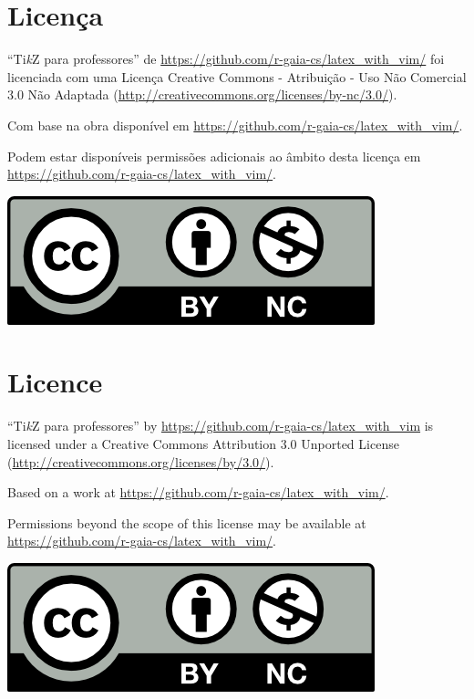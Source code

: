 % 
% 
% 
% 
% 
\section*{Licen\c{c}a}

``Ti\emph{k}Z para professores'' de \url{https://github.com/r-gaia-cs/latex_with_vim/} foi licenciada com uma Licen\c{c}a Creative Commons - Atribui\c{c}\~{a}o - Uso N\~{a}o Comercial 3.0 N\~{a}o Adaptada (\url{http://creativecommons.org/licenses/by-nc/3.0/}). 

Com base na obra dispon\'{i}vel em \url{https://github.com/r-gaia-cs/latex_with_vim/}. 

Podem estar dispon\'{i}veis permiss\~{o}es adicionais ao \^{a}mbito desta licen\c{c}a em \url{https://github.com/r-gaia-cs/latex_with_vim/}.

\begin{center}
    \includegraphics[keepaspectratio=true]{../../figures/by_nc.png}
\end{center}

\section*{Licence}

``Ti\emph{k}Z para professores'' by \url{https://github.com/r-gaia-cs/latex_with_vim} is licensed under a Creative Commons Attribution 3.0 Unported License (\url{http://creativecommons.org/licenses/by/3.0/}).

Based on a work at \url{https://github.com/r-gaia-cs/latex_with_vim/}.

Permissions beyond the scope of this license may be available at \url{https://github.com/r-gaia-cs/latex_with_vim/}.

\begin{center}
    \includegraphics[keepaspectratio=true]{../../figures/by_nc.png}
\end{center}
